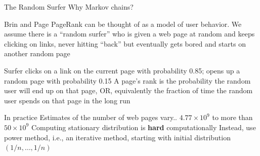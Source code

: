 \documentclass[aspectratio=169]{beamer}\usepackage[]{graphicx}\usepackage[]{xcolor}
\begin{document}
\begin{frame}{The Random Surfer}
	Why Markov chains?
	\vfill
\begin{block}{Brin and Page}
	PageRank can be thought of as a model of user behavior. We assume there is a ``random surfer'' who is given a web page at random and keeps clicking on links, never hitting ``back'' but eventually gets bored and starts on another random page
\end{block}
\vfill
Surfer clicks on a link on the current page with probability 0.85; opens up a random page with probability 0.15
\vfill
A page's rank is the probability the random user will end up on that page, OR, equivalently the fraction of time the random user spends on that page in the long run
\end{frame}


\begin{frame}{In practice}
	Estimates of the number of web pages vary.. $4.77\times 10^9$ to more than $50\times 10^9$
	\vfill 
	Computing stationary distribution is \textbf{hard} computationally
	\vfill
	Instead, use power method, i.e., an iterative method, starting with initial distribution $(1/n,\ldots,1/n)$
\end{frame}
\end{document}
